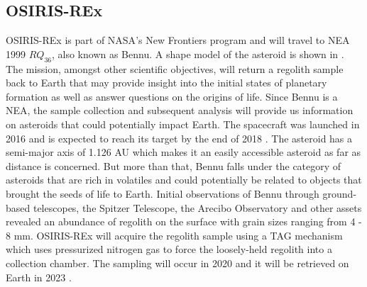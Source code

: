 \subsection{OSIRIS-REx}
\label{subsec:osiris_heritage}
\gls{OSIRIS-REx} is part of \gls{NASA}'s New Frontiers program and will travel to \gls{NEA} 1999 $RQ_{36}$, also known as Bennu. A shape model of the asteroid is shown in  \parencite{bennuShapeModel}. The mission, amongst other scientific objectives, will return a regolith sample back to Earth that may provide insight into the initial states of planetary formation as well as answer questions on the origins of life. Since Bennu is a \gls{NEA}, the sample collection and subsequent analysis will provide us information on asteroids that could potentially impact Earth. The spacecraft was launched in 2016 and is expected to reach its target by the end of 2018 \parencite{berry2013osiris}. The asteroid has a semi-major axis of 1.126 AU which makes it an easily accessible asteroid as far as distance is concerned. But more than that, Bennu falls under the category of asteroids that are rich in volatiles and could potentially be related to objects that brought the seeds of life to Earth. Initial observations of Bennu through ground-based telescopes, the Spitzer Telescope, the Arecibo Observatory and other assets revealed an abundance of regolith on the surface with grain sizes ranging from 4 - 8 \si{\milli\metre}. \gls{OSIRIS-REx} will acquire the regolith sample using a \gls{TAG} mechanism which uses pressurized nitrogen gas to force the loosely-held regolith into a collection chamber. The sampling will occur in 2020 and it will be retrieved on Earth in 2023 \parencite{osirisMissionOverview}.

